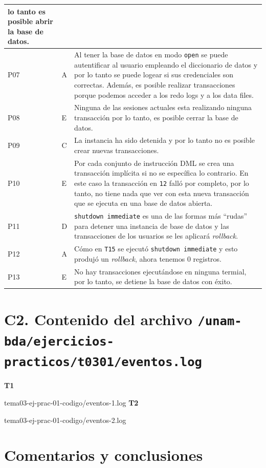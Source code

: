 \documentclass{article}
\begin{document}
\begin{longtable}[c]{
    |>{\centering}p{}
    |>{\centering}p{}
    |>{\arraybackslash}p{}|
}
lo tanto es posible abrir la base de datos.
\\
\hline
P07 & A & 
Al tener la base de datos en modo \texttt{open} se puede autentificar al usuario
empleando el diccionario de datos y por lo tanto se puede logear si sus 
credenciales son correctas. Además, es posible realizar transacciones porque
podemos acceder a los redo logs y a los data files.
\\
\hline
P08 & E & 
Ninguna de las sesiones actuales esta realizando ninguna transacción por lo 
tanto, es posible cerrar la base de datos.
\\
\hline
P09 & C & 
La instancia ha sido detenida y por lo tanto no es posible crear nuevas 
transacciones.
\\
\hline
P10 & E & 
Por cada conjunto de instrucción DML se crea una transacción implícita si
no se específica lo contrario. En este caso la transacción en \texttt{12} falló
por completo, por lo tanto, no tiene nada que ver con esta nueva transacción
que se ejecuta en una base de datos abierta.
\\
\hline
P11 & D & 
\texttt{shutdown immediate} es una de las formas más ``rudas'' para detener
una instancia de base de datos y las transacciones de los usuarios se les 
aplicará \textit{rollback}.
\\
\hline
P12 & A & 
Cómo en \texttt{T15} se ejecutó \texttt{shutdown immediate} y esto produjó
un \textit{rollback}, ahora tenemos 0 registros.
\\
\hline
P13 & E & 
No hay transacciones ejecutándose en ninguna termial, por lo tanto, se
detiene la base de datos con éxito.
\\
\hline
\end{longtable}
\endgroup 
\section*{C2. Contenido del archivo 
\texttt{/unam-bda/ejercicios-practicos/t0301/eventos.log}}
\begin{multicols}{2}
\textbf{T1}

    {tema03-ej-prac-01-codigo/eventos-1.log}
\columnbreak%
\textbf{T2}

    {tema03-ej-prac-01-codigo/eventos-2.log}    
\end{multicols}

\section*{Comentarios y conclusiones}
\end{document}
